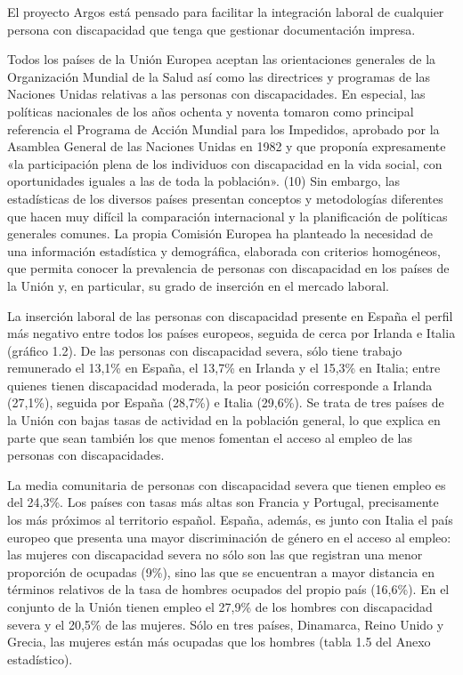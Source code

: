 El proyecto Argos está pensado para facilitar la integración laboral de cualquier persona con discapacidad que tenga que gestionar documentación impresa. 

Todos los países de la Unión Europea aceptan las orientaciones generales de la Organización Mundial de la Salud así como las directrices y programas de las Naciones Unidas relativas a las personas con discapacidades. En especial, las políticas nacionales de los años ochenta y noventa tomaron como principal referencia el Programa de Acción Mundial para los Impedidos, aprobado por la Asamblea General de las Naciones Unidas en 1982 y que proponía expresamente «la participación plena de los individuos con discapacidad en la vida social, con oportunidades iguales a las de toda la población». (10) Sin embargo, las estadísticas de los diversos países presentan conceptos y metodologías diferentes que hacen muy difícil la comparación internacional y la planificación de políticas generales comunes. La propia Comisión Europea ha planteado la necesidad de una información estadística y demográfica, elaborada con criterios homogéneos, que permita conocer la prevalencia de personas con discapacidad en los países de la Unión y, en particular, su grado de inserción en el mercado laboral.

La inserción laboral de las personas con discapacidad presente en España el perfil más negativo entre todos los países europeos, seguida de cerca por Irlanda e Italia (gráfico 1.2). De las personas con discapacidad severa, sólo tiene trabajo remunerado el 13,1\% en España, el 13,7\% en Irlanda y el 15,3\% en Italia; entre quienes tienen discapacidad moderada, la peor posición corresponde a Irlanda (27,1\%), seguida por España (28,7\%) e Italia (29,6\%). Se trata de tres países de la Unión con bajas tasas de actividad en la población general, lo que explica en parte que sean también los que menos fomentan el acceso al empleo de las personas con discapacidades.

La media comunitaria de personas con discapacidad severa que tienen empleo es del 24,3\%. Los países con tasas más altas son Francia y Portugal, precisamente los más próximos al territorio español. España, además, es junto con Italia el país europeo que presenta una mayor discriminación de género en el acceso al empleo: las mujeres con discapacidad severa no
sólo son las que registran una menor proporción de ocupadas (9\%), sino las que se encuentran a mayor distancia en términos relativos de la tasa de hombres ocupados del propio país (16,6\%). En el conjunto de la Unión tienen
empleo el 27,9\% de los hombres con discapacidad severa y el 20,5\% de las mujeres. Sólo en tres países, Dinamarca, Reino Unido y Grecia, las mujeres están más ocupadas que los hombres (tabla 1.5 del Anexo estadístico).

